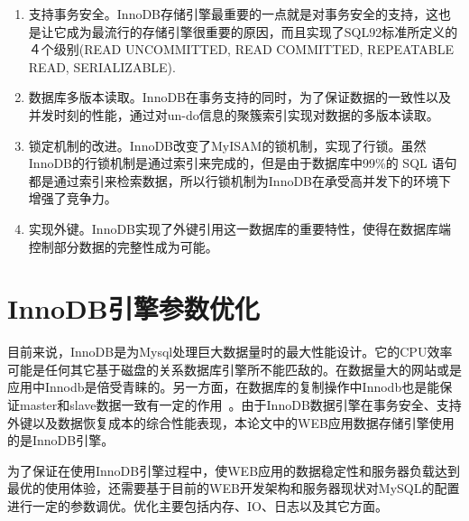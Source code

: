 \begin{enumerate}
\item 支持事务安全。InnoDB存储引擎最重要的一点就是对事务安全的支持，这也是让它成为最流行的存储引擎很重要的原因，而且实现了SQL92标准所定义的４个级别(READ UNCOMMITTED, READ COMMITTED, REPEATABLE READ, SERIALIZABLE).
\item 数据库多版本读取。InnoDB在事务支持的同时，为了保证数据的一致性以及并发时刻的性能，通过对un-do信息的聚簇索引实现对数据的多版本读取。
\item 锁定机制的改进。InnoDB改变了MyISAM的锁机制，实现了行锁。虽然InnoDB的行锁机制是通过索引来完成的，但是由于数据库中99\%的 SQL 语句都是通过索引来检索数据，所以行锁机制为InnoDB在承受高并发下的环境下增强了竞争力。
\item 实现外键。InnoDB实现了外键引用这一数据库的重要特性，使得在数据库端控制部分数据的完整性成为可能。
\end{enumerate}

\section{InnoDB引擎参数优化}

目前来说，InnoDB是为Mysql处理巨大数据量时的最大性能设计。它的CPU效率可能是任何其它基于磁盘的关系数据库引擎所不能匹敌的。在数据量大的网站或是应用中Innodb是倍受青睐的。另一方面，在数据库的复制操作中Innodb也是能保证master和slave数据一致有一定的作用~\cite{schwartz2012high}。由于InnoDB数据引擎在事务安全、支持外键以及数据恢复成本的综合性能表现，本论文中的WEB应用数据存储引擎使用的是InnoDB引擎。

为了保证在使用InnoDB引擎过程中，使WEB应用的数据稳定性和服务器负载达到最优的使用体验，还需要基于目前的WEB开发架构和服务器现状对MySQL的配置进行一定的参数调优。优化主要包括内存、IO、日志以及其它方面。

